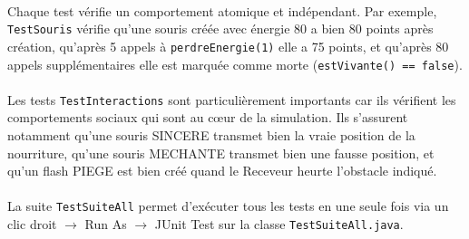 \paragraph{} Chaque test vérifie un comportement atomique et indépendant. Par exemple, \texttt{TestSouris} vérifie qu'une souris créée avec énergie 80 a bien 80 points après création, qu'après 5 appels à \texttt{perdreEnergie(1)} elle a 75 points, et qu'après 80 appels supplémentaires elle est marquée comme morte (\texttt{estVivante() == false}).

\paragraph{} Les tests \texttt{TestInteractions} sont particulièrement importants car ils vérifient les comportements sociaux qui sont au cœur de la simulation. Ils s'assurent notamment qu'une souris SINCERE transmet bien la vraie position de la nourriture, qu'une souris MECHANTE transmet bien une fausse position, et qu'un flash PIEGE est bien créé quand le Receveur heurte l'obstacle indiqué.

\paragraph{} La suite \texttt{TestSuiteAll} permet d'exécuter tous les tests en une seule fois via un clic droit $\rightarrow$ Run As $\rightarrow$ JUnit Test sur la classe \texttt{TestSuiteAll.java}.
